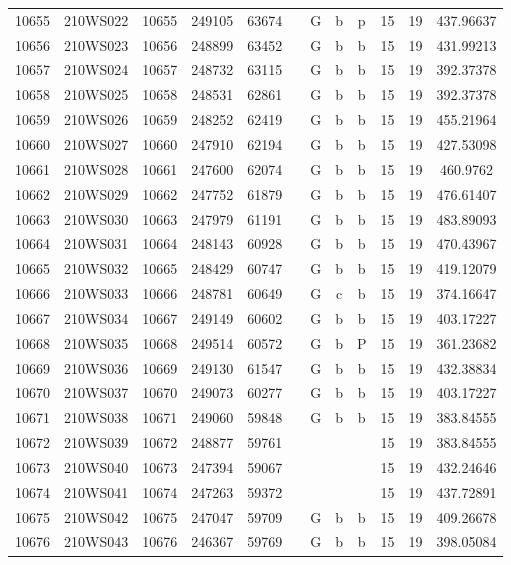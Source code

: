 \begin{tabular}{|*{12}{c|}}
10655 & 210WS022 & 10655 & 249105 & 63674 &  & G & b & p & 15 & 19 & 437.96637 \\ 
10656 & 210WS023 & 10656 & 248899 & 63452 &  & G & b & b & 15 & 19 & 431.99213 \\ 
10657 & 210WS024 & 10657 & 248732 & 63115 &  & G & b & b & 15 & 19 & 392.37378 \\ 
10658 & 210WS025 & 10658 & 248531 & 62861 &  & G & b & b & 15 & 19 & 392.37378 \\ 
10659 & 210WS026 & 10659 & 248252 & 62419 &  & G & b & b & 15 & 19 & 455.21964 \\ 
10660 & 210WS027 & 10660 & 247910 & 62194 &  & G & b & b & 15 & 19 & 427.53098 \\ 
10661 & 210WS028 & 10661 & 247600 & 62074 &  & G & b & b & 15 & 19 & 460.9762 \\ 
10662 & 210WS029 & 10662 & 247752 & 61879 &  & G & b & b & 15 & 19 & 476.61407 \\ 
10663 & 210WS030 & 10663 & 247979 & 61191 &  & G & b & b & 15 & 19 & 483.89093 \\ 
10664 & 210WS031 & 10664 & 248143 & 60928 &  & G & b & b & 15 & 19 & 470.43967 \\ 
10665 & 210WS032 & 10665 & 248429 & 60747 &  & G & b & b & 15 & 19 & 419.12079 \\ 
10666 & 210WS033 & 10666 & 248781 & 60649 &  & G & c & b & 15 & 19 & 374.16647 \\ 
10667 & 210WS034 & 10667 & 249149 & 60602 &  & G & b & b & 15 & 19 & 403.17227 \\ 
10668 & 210WS035 & 10668 & 249514 & 60572 &  & G & b & P & 15 & 19 & 361.23682 \\ 
10669 & 210WS036 & 10669 & 249130 & 61547 &  & G & b & b & 15 & 19 & 432.38834 \\ 
10670 & 210WS037 & 10670 & 249073 & 60277 &  & G & b & b & 15 & 19 & 403.17227 \\ 
10671 & 210WS038 & 10671 & 249060 & 59848 &  & G & b & b & 15 & 19 & 383.84555 \\ 
10672 & 210WS039 & 10672 & 248877 & 59761 &  &  &  &  & 15 & 19 & 383.84555 \\ 
10673 & 210WS040 & 10673 & 247394 & 59067 &  &  &  &  & 15 & 19 & 432.24646 \\ 
10674 & 210WS041 & 10674 & 247263 & 59372 &  &  &  &  & 15 & 19 & 437.72891 \\ 
10675 & 210WS042 & 10675 & 247047 & 59709 &  & G & b & b & 15 & 19 & 409.26678 \\ 
10676 & 210WS043 & 10676 & 246367 & 59769 &  & G & b & b & 15 & 19 & 398.05084 \\ 

\end{tabular}
